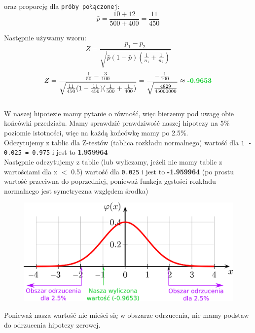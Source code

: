 \documentclass[12pt]{article}
\begin{document}
    oraz proporcję dla \texttt{próby połączonej}:
    \begin{equation*}
        \bar{p} = \frac{10 + 12}{500 + 400} = \frac{11}{450}
    \end{equation*}

    Następnie używamy wzoru:
    \begin{equation*}
        Z = \frac{p_{1} - p_{2}}{\sqrt{\bar{p}(1-\bar{p})(\frac{1}{n_{1}} + \frac{1}{n_{2}})}}
    \end{equation*}
    \begin{equation*}
        Z = \frac{\frac{1}{50} - \frac{3}{100}}{\sqrt{\frac{11}{450}(1-\frac{11}{450})(\frac{1}{500} + \frac{1}{400})}} = \frac{-\frac{1}{100}}{\sqrt{\frac{4829}{45000000}}} \approx \textbf{\color[HTML]{00ca1f}-0.9653}
    \end{equation*} \\

    W naszej hipotezie mamy pytanie o równość, więc bierzemy pod uwagę obie końcówki przedziału. Mamy sprawdzić prawdziwość naszej hipotezy na 5\% poziomie istotności, więc na każdą końcówkę mamy po 2.5\%. \\

    Odczytujemy z tablic dla Z-testów (tablica rozkładu normalnego) wartość dla \texttt{1 - 0.025 = 0.975} i jest to \textbf{\color[HTML]{b30eff}1.959964} \\

    Następnie odczytujemy z tablic (lub wyliczamy, jeżeli nie mamy tablic z wartościami dla x $<$ 0.5) wartość dla \texttt{0.025} i jest to \textbf{\color[HTML]{b30eff}-1.959964} (po prostu wartość przeciwna do poprzedniej, ponieważ funkcja gęstości rozkładu normalnego jest symetryczna względem środka)

    \begin{figure}[H]
        \center
        \includegraphics[width=0.7\linewidth]{z-test.png}
    \end{figure}

    Ponieważ nasza wartość nie mieści się w obszarze odrzucenia, nie mamy podstaw do odrzucenia hipotezy zerowej.
\end{document}
